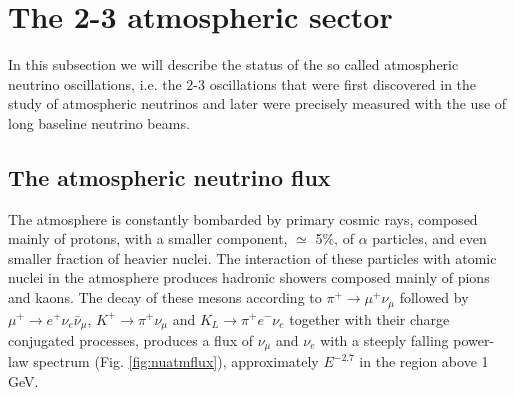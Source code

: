 \section{The 2-3 atmospheric sector }

In this subsection we will describe the status of the so called atmospheric neutrino oscillations, i.e. the 2-3 oscillations that were first discovered in the study of atmospheric neutrinos and later were precisely measured with the use of long baseline neutrino beams.   


\subsection{The atmospheric neutrino flux}

The atmosphere is constantly bombarded by primary cosmic rays, composed mainly of protons, with a smaller component, $\simeq$ 5\%, of $\alpha$ particles, and even smaller fraction of heavier nuclei. The interaction of these particles with atomic nuclei in the atmosphere produces hadronic showers composed mainly of pions and kaons. The decay of these mesons according to 
$\pi^+ \rightarrow \mu^+ \nu_\mu$ followed by 
$\mu^+ \rightarrow e^+ \nu_e \bar{\nu}_\mu $,
$K^+ \rightarrow \pi^+ \nu_\mu$ and $K_L \rightarrow \pi^+ e^- \nu_e$
together with their charge conjugated processes, produces a flux of $\nu_\mu$ and $\nu_e$ with a steeply falling power-law spectrum (Fig. \ref{fig:nuatmflux}), approximately $E^{-2.7}$ in the region above 1 GeV.   


